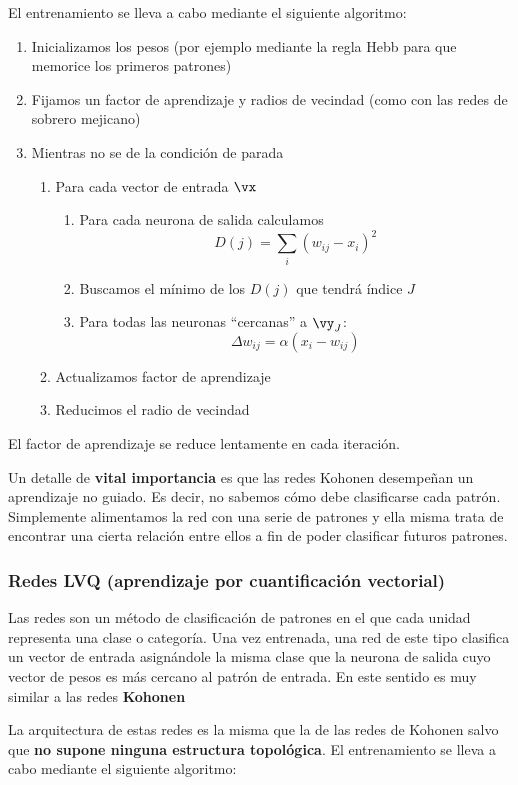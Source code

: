 El entrenamiento se lleva a cabo mediante el siguiente algoritmo:
\begin{enumerate}
\item Inicializamos los pesos (por ejemplo mediante la regla Hebb para que memorice los primeros patrones)
\item Fijamos un factor de aprendizaje y radios de vecindad (como con las redes de sobrero mejicano)
\item Mientras no se de la condición de parada
\begin{enumerate}
\item Para cada vector de entrada $\vx$
\begin{enumerate}
\item Para cada neurona de salida calculamos
\[D(j)=\sum_i (w_{ij}-x_i)^2\]
\item Buscamos el mínimo de los $D(j)$ que tendrá índice $J$
\item Para todas las neuronas ``cercanas'' a $\vy_J$:
\[Δw_{ij} = α(x_i-w_{ij})\]
\end{enumerate}
\item Actualizamos factor de aprendizaje
\item Reducimos el radio de vecindad
\end{enumerate}
\end{enumerate}

\obs El factor de aprendizaje se reduce lentamente en cada iteración.

\obs Un detalle de \textbf{vital importancia} es que las redes Kohonen desempeñan un aprendizaje no guiado. Es decir, no sabemos cómo debe clasificarse cada patrón. Simplemente alimentamos la red con una serie de patrones y ella misma trata de encontrar una cierta relación entre ellos a fin de poder clasificar futuros patrones.

\subsubsection{Redes LVQ (aprendizaje por cuantificación vectorial)}
Las redes  son un método de clasificación de patrones en el que cada unidad representa una clase o categoría. Una vez entrenada, una red de este tipo clasifica un vector de entrada asignándole la misma clase que la neurona de salida cuyo vector de pesos es más cercano al patrón de entrada. En este sentido es muy similar a las redes \textbf{Kohonen}

La arquitectura de estas redes es la misma que la de las redes de Kohonen salvo que \textbf{no supone ninguna estructura topológica}. El entrenamiento se lleva a cabo mediante el siguiente algoritmo:

